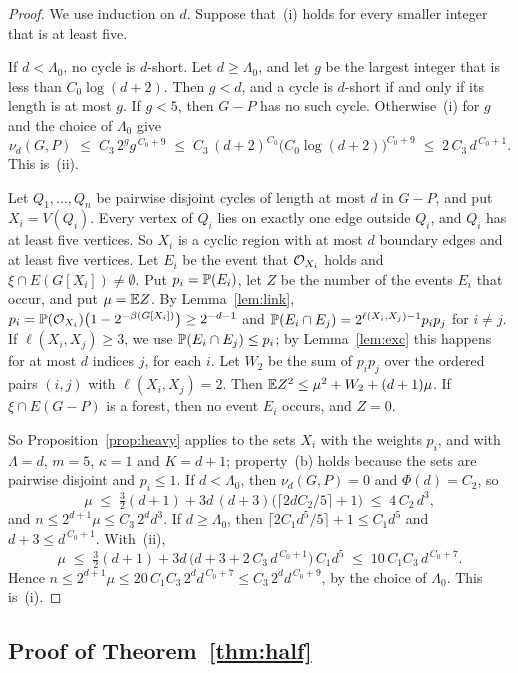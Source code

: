 \begin{proof}
We use induction on $d$. Suppose that~(i) holds for every smaller integer that is at least five.

 If $d<\Lambda_0$, no cycle is $d$-short. Let $d\ge\Lambda_0$, and let
$g$ be the largest integer that is less than $C_0\log(d+2)$. Then $g<d$, and a cycle is $d$-short
if and only if its length is at most $g$. If $g<5$, then $G-P$ has no such cycle. Otherwise~(i)
for $g$ and the choice of $\Lambda_0$ give
\[
  \nu_d(G,P)\;\le\;C_3\,2^{g}g^{\,C_0+9}\;\le\;C_3\,(d+2)^{C_0}\bigl(C_0\log(d+2)\bigr)^{C_0+9}
  \;\le\;2\,C_3\,d^{\,C_0+1}.
\]
This is~(ii).

 Let $Q_1,\dots,Q_n$ be pairwise disjoint cycles of
length at most $d$ in $G-P$, and put $X_i=V(Q_i)$. Every vertex of $Q_i$ lies on exactly one edge
outside $Q_i$, and $Q_i$ has at least five vertices. So $X_i$ is a cyclic region with at most $d$
boundary edges and at least five vertices. Let $E_i$ be the event that $\mathcal{O}_{X_i}$ holds and
$\xi\cap E(G[X_i])\ne\emptyset$. Put $p_i=\mathbb{P}(E_i)$, let $Z$ be the number of the events $E_i$
that occur, and put $\mu=\mathbb{E} Z$. By Lemma~\ref{lem:link},
$p_i=\mathbb{P}(\mathcal{O}_{X_i})\bigl(1-2^{-\beta(G[X_i])}\bigr)\ge2^{-d-1}$ and
$\mathbb{P}(E_i\cap E_j)=2^{\ell(X_i,X_j)-1}p_ip_j$ for $i\ne j$. If $\ell(X_i,X_j)\ge3$, we use
$\mathbb{P}(E_i\cap E_j)\le p_i$; by Lemma~\ref{lem:exc} this happens for at most $d$ indices $j$, for
each $i$. Let $W_2$ be the sum of $p_ip_j$ over the ordered pairs $(i,j)$ with
$\ell(X_i,X_j)=2$. Then $\mathbb{E} Z^{2}\le\mu^{2}+W_2+(d+1)\mu$. If $\xi\cap E(G-P)$ is a forest,
then no event $E_i$ occurs, and $Z=0$.

So Proposition~\ref{prop:heavy} applies to the sets $X_i$ with the weights $p_i$, and with
$\Lambda=d$, $m=5$, $\kappa=1$ and $K=d+1$; property~(b) holds because the sets are pairwise
disjoint and $p_i\le1$. If $d<\Lambda_0$, then $\nu_d(G,P)=0$ and $\Phi(d)=C_2$, so
\[
  \mu\;\le\;\tfrac32(d+1)+3d\,(d+3)\bigl(\lceil2dC_2/5\rceil+1\bigr)\;\le\;4\,C_2\,d^{3},
\]
and $n\le2^{d+1}\mu\le C_3\,2^{d}d^{3}$. If $d\ge\Lambda_0$, then
$\lceil2C_1d^{5}/5\rceil+1\le C_1d^{5}$ and $d+3\le d^{\,C_0+1}$. With~(ii),
\[
  \mu\;\le\;\tfrac32(d+1)+3d\,\bigl(d+3+2\,C_3\,d^{\,C_0+1}\bigr)\,C_1d^{5}
  \;\le\;10\,C_1C_3\,d^{\,C_0+7}.
\]
Hence $n\le2^{d+1}\mu\le20\,C_1C_3\,2^{d}d^{\,C_0+7}\le C_3\,2^{d}d^{\,C_0+9}$, by the choice of
$\Lambda_0$. This is~(i).
\end{proof}

\subsection{Proof of Theorem~\ref{thm:half}}\label{sec:halfproof}

